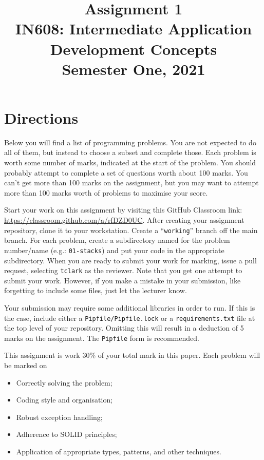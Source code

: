 \documentclass{article}
\begin{document}
\title{Assignment 1\\IN608: Intermediate Application Development Concepts \\Semester One, 2021}
\date{}
\maketitle

\section*{Directions}
Below you will find a list of programming problems. You are not expected to do all of them, but instead to choose a subset and complete those. Each problem is worth some number of marks, indicated at the start of the problem. You should probably attempt to complete a set of questions worth about 100 marks. You can't get more than 100 marks on the assignment, but you may want to attempt more than 100 marks worth of problems to maximise your score.


Start your work on this assignment by visiting this GitHub Classroom link: \url{https://classroom.github.com/a/rfDZD0UC}. After creating your assignment repository, clone it to your workstation.  Create a ``\texttt{working}'' branch off the main branch. For each problem, create a subdirectory named for the problem number/name (e.g.: \texttt{01-stacks}) and put your code in the appropriate subdirectory. When you are ready to submit your work for marking, issue a pull request, selecting \texttt{tclark} as the reviewer. Note that you get one attempt to submit your work. However, if you make a mistake in your submission, like forgetting to include some files, just let the lecturer know.


Your submission may require some additional libraries in order to run. If this is the case, include either a \texttt{Pipfile/Pipfile.lock} or a \texttt{requirements.txt} file at the top level of your repository. Omitting this will result in a deduction of 5 marks on the assignment. The \texttt{Pipfile} form is recommended.

This assignment is work 30\% of your total mark in this paper. Each problem will be marked on 
\begin{itemize}
  \item Correctly solving the problem;
  \item Coding style and organisation;
  \item Robust exception handling;
  \item Adherence to SOLID principles;
  \item Application of appropriate types, patterns, and other techniques.
\end{itemize}  
\end{document}
